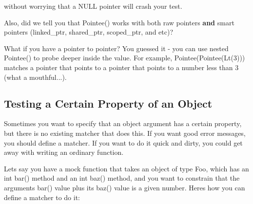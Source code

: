 without worrying that a {\ttfamily N\+U\+LL} pointer will crash your test.

Also, did we tell you that {\ttfamily Pointee()} works with both raw pointers {\bfseries{and}} smart pointers ({\ttfamily linked\+\_\+ptr}, {\ttfamily shared\+\_\+ptr}, {\ttfamily scoped\+\_\+ptr}, and etc)?

What if you have a pointer to pointer? You guessed it -\/ you can use nested {\ttfamily Pointee()} to probe deeper inside the value. For example, {\ttfamily Pointee(Pointee(\+Lt(3)))} matches a pointer that points to a pointer that points to a number less than 3 (what a mouthful...).

\subsection*{Testing a Certain Property of an Object}

Sometimes you want to specify that an object argument has a certain property, but there is no existing matcher that does this. If you want good error messages, you should define a matcher. If you want to do it quick and dirty, you could get away with writing an ordinary function.

Let\textquotesingle{}s say you have a mock function that takes an object of type {\ttfamily Foo}, which has an {\ttfamily int bar()} method and an {\ttfamily int baz()} method, and you want to constrain that the argument\textquotesingle{}s {\ttfamily bar()} value plus its {\ttfamily baz()} value is a given number. Here\textquotesingle{}s how you can define a matcher to do it\+:


\begin{DoxyCode}{0}
\DoxyCodeLine{}
\DoxyCodeLine{}
\DoxyCodeLine{  \}}
\DoxyCodeLine{}
\DoxyCodeLine{  \}}
\DoxyCodeLine{}
\DoxyCodeLine{  \}}
\DoxyCodeLine{\};}
\DoxyCodeLine{}
\DoxyCodeLine{\}}
\DoxyCodeLine{}
\DoxyCodeLine{}
\end{DoxyCode}


